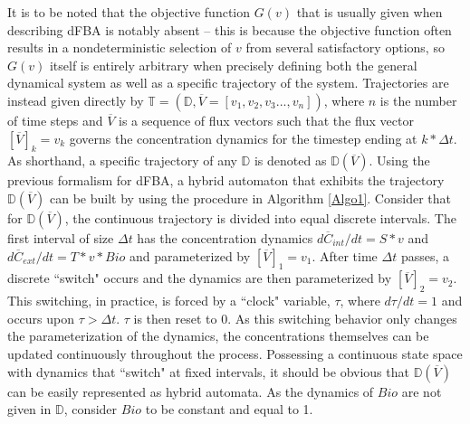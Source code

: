 It is to be noted that the objective function $G(v)$ that is usually given when describing dFBA is notably absent -- this is because the objective function often results in a nondeterministic selection of $v$ from several satisfactory options, so $G(v)$ itself is entirely arbitrary when precisely defining both the general dynamical system as well as a specific trajectory of the system. Trajectories are instead given directly by $\mathbb{T} = (\mathbb{D}, \overline{V} = [v_1, v_2, v_3..., v_n])$, where $n$ is the number of time steps and $\overline{V}$ is a sequence of flux vectors such that the flux vector $[\overline{V}]_k = v_k$ governs the concentration dynamics for the timestep ending at $k * \Delta t$. As shorthand, a specific trajectory of any $\mathbb{D}$ is denoted as $\mathbb{D}(\overline{V})$.
Using the previous formalism for dFBA, a hybrid automaton that exhibits the trajectory $\mathbb{D}(\overline{V})$ can be built by using the procedure in Algorithm \ref{Algo1}. Consider that for $\mathbb{D}(\overline{V})$, the continuous trajectory is divided into equal discrete intervals. The first interval of size $\Delta t$ has the concentration dynamics $d\overline{C}_{int}/dt = S * v$ and $d\overline{C}_{ext}/dt = T * v * Bio$ and parameterized by $[\overline{V}]_1 = v_1$. After time $\Delta t$ passes, a discrete ``switch" occurs and the dynamics are then parameterized by $[\overline{V}]_2 = v_2$. This switching, in practice, is forced by a ``clock" variable, $\tau$, where $d\tau / dt = 1$ and occurs upon $\tau > \Delta t$. $\tau$ is then reset to $0$. As this switching behavior only changes the parameterization of the dynamics, the concentrations themselves can be updated continuously throughout the process. Possessing a continuous state space with dynamics that ``switch" at fixed intervals, it should be obvious that $\mathbb{D}(\overline{V})$ can be easily represented as hybrid automata. As the dynamics of $Bio$ are not given in $\mathbb{D}$, consider $Bio$ to be constant and equal to 1.

